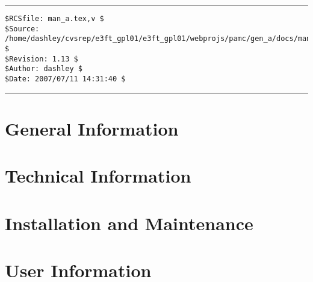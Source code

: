 \documentclass[letterpaper,10pt,titlepage]{custbook}
\begin{document}
%

%

%
%
\vspace{-0.45in}
%
\noindent\begin{minipage}{\textwidth}
\noindent\rule[-0.25in]{\textwidth}{1pt}
\begin{tiny}
\begin{verbatim}
$RCSfile: man_a.tex,v $
$Source: /home/dashley/cvsrep/e3ft_gpl01/e3ft_gpl01/webprojs/pamc/gen_a/docs/manual/man_a/man_a.tex,v $
$Revision: 1.13 $
$Author: dashley $
$Date: 2007/07/11 14:31:40 $
\end{verbatim}
\end{tiny}
\noindent\rule[0.25in]{\textwidth}{1pt}
\end{minipage}
%
\frontmatter{}
%

%

%
\tableofcontents
%
\listoftables
%
\listoffigures
%
\listofprocchklsts
%
\mainmatter{}
%
\part{General Information}



\part{Technical Information}





\part{Installation and Maintenance}





\part{User Information}
\end{document}
